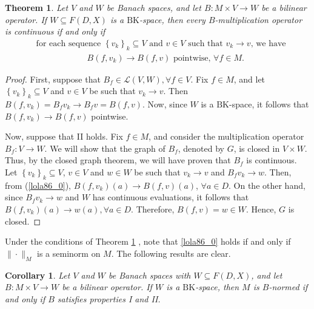 \documentclass[14pt, a4paper]{article}  %
\providecommand{\llave}[1]{\left\lbrace #1\right\rbrace }
\providecommand{\pare}[1]{\left( #1\right) }
\newcommand{\tien}{\rightarrow}
\newcommand{\BK}{\text{BK}}
\newtheorem{corollary}{Corollary}[section]
\newtheorem{theorem}{Theorem}[section]
\begin{document}
\begin{theorem}\label{bobo}\label{piz21}
	Let $V$ and $W$ be Banach spaces, and let $B:M\times V\tien W$ be a bilinear operator. If $W\subseteq F\pare{D,X}$ is a $\BK$-space, then every $B$-multiplication operator is continuous if and only if 
	\begin{align} 
		&\text{for each sequence $\llave{v_{k}}_{k}\subseteq V$ and $v\in V$ such that $v_{k}\tien v$, we have} \nonumber\\[.3 cm]
		&\qquad \qquad \qquad \text{$B\pare{f,v_{k}} \tien B\pare{f,v}$ pointwise, $\forall f\in M$}.
		\tag{Property II} \label{lola86_0}
	\end{align}  
\end{theorem}
\begin{proof}
	First, suppose that $B_{f}\in \mathcal{L}\pare{V,W},\forall f\in V$.  Fix  $f\in M$, and let $\llave{v_{k}}_{k}\subseteq V$ and $v\in V$ be such that $v_{k}\tien v$. Then  $B\pare{f,v_{k}}=B_{f}v_{k}\tien B_{f}v=B\pare{f,v}.$ Now, since $W$ is a $\BK$-space, it follows that $B\pare{f,v_{k}} \tien  B\pare{f,v}$ pointwise.
	
	Now, suppose that II holds. Fix $f\in M$, and consider the multiplication operator    $B_{f}:V\tien W$. We will show that the graph of  $B_{f}$, denoted by $G$, is closed in $V\times W$. Thus,  by the closed graph theorem, we will have proven that $B_{f}$ is continuous. Let $\llave{v_{k}}_{k}\subseteq V$, $v\in V$ and $w\in W$ be such that $v_{k}\tien v$ and $B_{f}v_{k}\tien w$. Then, from (\ref{lola86_0}),   $B\pare{f,v_{k}}\pare{a}\tien B\pare{f,v}\pare{a}$, $\forall a\in D$. On the other hand, since $B_{f}v_{k}\tien w$ and $W$ has continuous evaluations, it follows that $B\pare{f,v_{k}}\pare{a}\tien w\pare{a},\forall a\in D$. Therefore, $B\pare{f,v}=w\in W$.  Hence, $G$ is closed.	  
\end{proof}

 

Under the conditions of Theorem \ref{bobo} , note that \ref{lola86_0} holds if and only if  $\|\cdot\|_M$ is a seminorm on $M$. The following results are clear.

\begin{corollary}\label{piz11_b_0}   Let $V$ and $W$ be Banach spaces with $W \subseteq  F(D,X)$, and let $B:M\times V\tien   W$ be a bilinear operator. If $W$ is a $\BK$-space, then $M$ is  $B$-normed if and only if $B$ satisfies properties I and II.
\end{corollary} 
\end{document}

